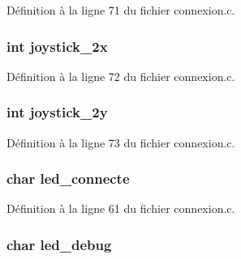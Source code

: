 Définition à la ligne 71 du fichier connexion.\-c.

\hypertarget{structetat__commandes_ab13efe455d7039d936ed7c8909581001}{
\subsubsection[{joystick\-\_\-2x}]{\setlength{\rightskip}{0pt plus 5cm}int joystick\-\_\-2x}}\label{structetat__commandes_ab13efe455d7039d936ed7c8909581001}


Définition à la ligne 72 du fichier connexion.\-c.

\hypertarget{structetat__commandes_a22286f59a64543f8e90ee521270110bd}{
\subsubsection[{joystick\-\_\-2y}]{\setlength{\rightskip}{0pt plus 5cm}int joystick\-\_\-2y}}\label{structetat__commandes_a22286f59a64543f8e90ee521270110bd}


Définition à la ligne 73 du fichier connexion.\-c.

\hypertarget{structetat__commandes_a38345f0aebb4de891510939a4d1b6d3f}{
\subsubsection[{led\-\_\-connecte}]{\setlength{\rightskip}{0pt plus 5cm}char led\-\_\-connecte}}\label{structetat__commandes_a38345f0aebb4de891510939a4d1b6d3f}


Définition à la ligne 61 du fichier connexion.\-c.

\hypertarget{structetat__commandes_aa6c5f40a4dec71b510d913e4c09e3cee}{
\subsubsection[{led\-\_\-debug}]{\setlength{\rightskip}{0pt plus 5cm}char led\-\_\-debug}}\label{structetat__commandes_aa6c5f40a4dec71b510d913e4c09e3cee}


